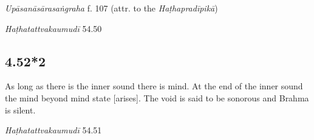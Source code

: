 \begin{ekdosis}

\begin{testimonia}[hp04_052_1]
\emph{Upāsanāsārasaṅgraha} f. 107 (attr. to the \emph{Haṭhapradīpikā})
\begin{versinnote}
\end{versinnote}

\emph{Haṭhatattvakaumudī} 54.50
\begin{versinnote}
\end{versinnote}
\end{testimonia}


\subsection*{4.52*2}
\begin{translation}[hp04_052_2]
As long as there is the inner sound there is mind. At the end of the inner sound the mind beyond mind state [arises]. The void is said to be sonorous and Brahma is silent.
\end{translation}


\begin{testimonia}[hp04_052_2]
\emph{Haṭhatattvakaumudī} 54.51
\begin{versinnote}
\end{versinnote}
\end{testimonia}


\end{ekdosis}
